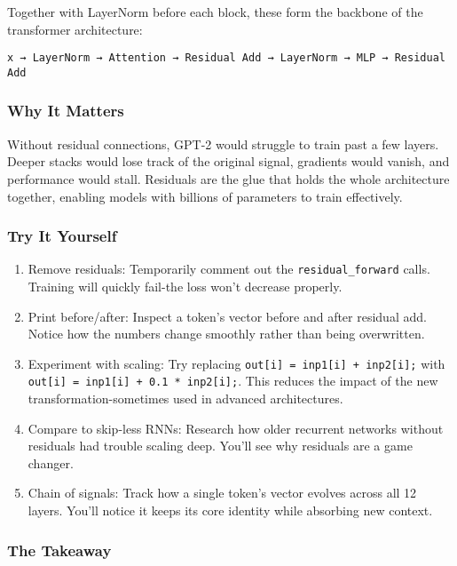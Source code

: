 \documentclass[
  letterpaper,
  DIV=11,
  numbers=noendperiod]{scrreprt}
\providecommand{\tightlist}{%
  \setlength{\itemsep}{0pt}\setlength{\parskip}{0pt}}
\begin{document}
Together with LayerNorm before each block, these form the backbone of
the transformer architecture:

\begin{verbatim}
x → LayerNorm → Attention → Residual Add → LayerNorm → MLP → Residual Add
\end{verbatim}

\subsubsection{Why It Matters}\label{why-it-matters-23}

Without residual connections, GPT-2 would struggle to train past a few
layers. Deeper stacks would lose track of the original signal, gradients
would vanish, and performance would stall. Residuals are the glue that
holds the whole architecture together, enabling models with billions of
parameters to train effectively.

\subsubsection{Try It Yourself}\label{try-it-yourself-25}

\begin{enumerate}
\def\labelenumi{\arabic{enumi}.}
\tightlist
\item
  Remove residuals: Temporarily comment out the
  \texttt{residual\_forward} calls. Training will quickly fail-the loss
  won't decrease properly.
\item
  Print before/after: Inspect a token's vector before and after residual
  add. Notice how the numbers change smoothly rather than being
  overwritten.
\item
  Experiment with scaling: Try replacing
  \texttt{out{[}i{]}\ =\ inp1{[}i{]}\ +\ inp2{[}i{]};} with
  \texttt{out{[}i{]}\ =\ inp1{[}i{]}\ +\ 0.1\ *\ inp2{[}i{]};}. This
  reduces the impact of the new transformation-sometimes used in
  advanced architectures.
\item
  Compare to skip-less RNNs: Research how older recurrent networks
  without residuals had trouble scaling deep. You'll see why residuals
  are a game changer.
\item
  Chain of signals: Track how a single token's vector evolves across all
  12 layers. You'll notice it keeps its core identity while absorbing
  new context.
\end{enumerate}

\subsubsection{The Takeaway}\label{the-takeaway-25}
\end{document}
